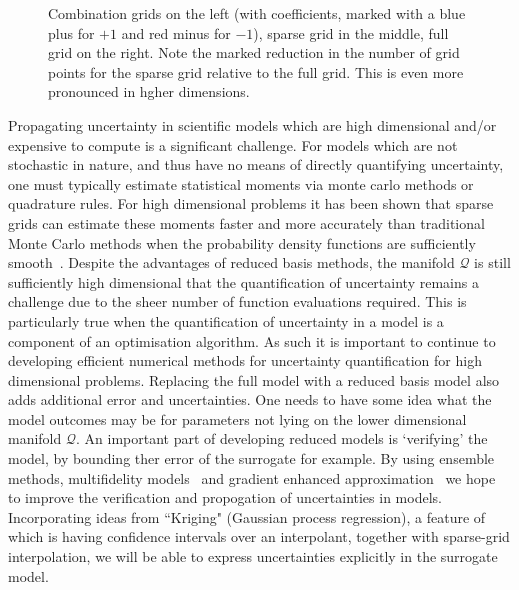 \documentclass[a4paper,fontsize=13pt]{scrartcl}
\begin{document}
\begin{figure}
  \centering
    
  \caption{Combination grids on the left (with coefficients, marked with
    a blue plus for $+1$ and red minus for $-1$), sparse grid in the
    middle, full grid on the right. Note the marked reduction in the number of 
    grid points for the sparse grid relative to the full grid. 
   This is even more pronounced in hgher dimensions.}
  \label{fig:sparse_grids}
\end{figure}

Propagating uncertainty in scientific models which are high dimensional 
and/or expensive to compute is a significant challenge.
For models which are not stochastic in nature, and thus have no means
of directly quantifying uncertainty, one must typically estimate statistical 
moments via monte carlo methods or quadrature rules. For high dimensional problems 
it has been shown that sparse grids can estimate these moments faster 
and more accurately than traditional Monte Carlo methods when the 
probability density functions are sufficiently smooth~\parencite{JakemanRoberts2013,FranzelinDiehlPfluger2014}.
Despite the advantages of reduced basis methods, the manifold $\mathcal{Q}$
is still sufficiently high dimensional that the quantification of uncertainty
remains a challenge due to the sheer number of function evaluations required. 
This is particularly true when the quantification of uncertainty in a model is a component of an optimisation algorithm.
As such it is important to continue to developing efficient numerical methods for 
uncertainty quantification for high dimensional problems.
Replacing the full model with a reduced basis model also adds additional 
error and uncertainties. One needs to have some idea what the model outcomes may be 
for parameters not lying on the lower dimensional manifold $\mathcal{Q}$.
An important part of developing reduced models is `verifying' the model, by bounding ther error of the surrogate for example.
By using ensemble methods, multifidelity models~\parencite{NgWillcox2014} and gradient enhanced approximation~\parencite{deBaarHarding2015,Jakeman2015} we hope to improve the verification and propogation of uncertainties in models.
Incorporating ideas from ``Kriging" (Gaussian process regression), a feature of which is having 
confidence intervals over an interpolant, together with sparse-grid interpolation,
we will be able to express uncertainties explicitly in the surrogate model. \\
\end{document}

